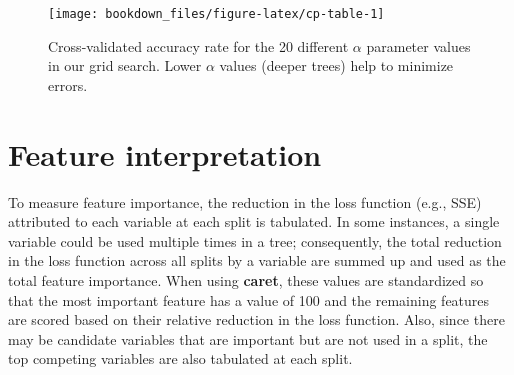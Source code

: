 \documentclass[]{krantz}
\makeatletter
\newenvironment{Shaded}{\begin{snugshade}}{\end{snugshade}}
\newcommand{\CommentTok}[1]{\textcolor[rgb]{0.37,0.37,0.37}{\textit{#1}}}
\newcommand{\DataTypeTok}[1]{\textcolor[rgb]{0.27,0.27,0.27}{#1}}
\newcommand{\DecValTok}[1]{\textcolor[rgb]{0.06,0.06,0.06}{#1}}
\newcommand{\KeywordTok}[1]{\textcolor[rgb]{0.27,0.27,0.27}{\textbf{#1}}}
\newcommand{\NormalTok}[1]{#1}
\newcommand{\OperatorTok}[1]{\textcolor[rgb]{0.43,0.43,0.43}{\textbf{#1}}}
\newcommand{\StringTok}[1]{\textcolor[rgb]{0.5,0.5,0.5}{#1}}
\newenvironment{kframe}{%
\medskip{}
\setlength{\fboxsep}{.8em}
 \def\at@end@of@kframe{}%
 \ifinner\ifhmode%
  \def\at@end@of@kframe{\end{minipage}}%
  \begin{minipage}{\columnwidth}%
 \fi\fi%
 \def\FrameCommand##1{\hskip\@totalleftmargin \hskip-\fboxsep
 \colorbox{shadecolor}{##1}\hskip-\fboxsep
     \hskip-\linewidth \hskip-\@totalleftmargin \hskip\columnwidth}%
 \MakeFramed {\advance\hsize-\width
   \@totalleftmargin\z@ \linewidth\hsize
   \@setminipage}}%
 {\par\unskip\endMakeFramed%
 \at@end@of@kframe}
\renewenvironment{Shaded}{\begin{kframe}}{\end{kframe}}
\makeatother
\begin{document}
\begin{Shaded}
\end{Shaded}

\begin{figure}

{\centering \texttt{[image: bookdown\_files/figure-latex/cp-table-1]} 

}

\caption{Cross-validated accuracy rate for the 20 different $\alpha$ parameter values in our grid search. Lower $\alpha$ values (deeper trees) help to minimize errors.}\label{fig:cp-table}
\end{figure}

\hypertarget{dt-vip}{%
\section{Feature interpretation}\label{dt-vip}}

To measure feature importance, the reduction in the loss function (e.g., SSE) attributed to each variable at each split is tabulated. In some instances, a single variable could be used multiple times in a tree; consequently, the total reduction in the loss function across all splits by a variable are summed up and used as the total feature importance. When using \textbf{caret}, these values are standardized so that the most important feature has a value of 100 and the remaining features are scored based on their relative reduction in the loss function. Also, since there may be candidate variables that are important but are not used in a split, the top competing variables are also tabulated at each split.
\end{document}
